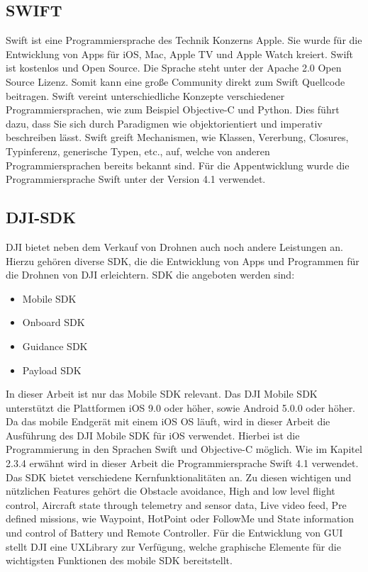 \subsection{SWIFT}\label{subsec:SWIFT}
Swift ist eine Programmiersprache des Technik Konzerns Apple. Sie wurde für die Entwicklung von Apps für iOS, Mac, Apple TV und Apple Watch kreiert. Swift ist kostenlos und Open Source. Die Sprache steht unter der Apache 2.0 Open Source Lizenz. Somit kann eine große Community direkt zum Swift Quellcode beitragen. 
\newline
Swift vereint unterschiedliche Konzepte verschiedener Programmiersprachen, wie zum Beispiel Objective-C und Python. Dies führt dazu, dass Sie sich durch Paradigmen wie objektorientiert und imperativ beschreiben lässt. Swift greift Mechanismen, wie Klassen, Vererbung, Closures, Typinferenz, generische Typen, etc., auf, welche von anderen Programmiersprachen bereits bekannt sind. 
\newline
Für die Appentwicklung wurde die Programmiersprache Swift unter der Version 4.1 verwendet. \cite{Swift} 

\subsection{DJI-\acf{SDK}}\label{subsec:DJI-SDK}
DJI bietet neben dem Verkauf von Drohnen auch noch andere Leistungen an. Hierzu gehören diverse \acs{SDK}, die die Entwicklung von Apps und Programmen für die Drohnen von DJI erleichtern. 
\acs{SDK} die angeboten werden sind:
\begin{itemize}
	\item Mobile SDK
	\item Onboard SDK
	\item Guidance SDK
	\item Payload SDK
\end{itemize}
In dieser Arbeit ist nur das Mobile SDK relevant. 
\newline
Das DJI Mobile SDK unterstützt die Plattformen iOS 9.0 oder höher, sowie Android 5.0.0 oder höher. Da das mobile Endgerät mit einem iOS \acs{OS} läuft, wird in dieser Arbeit die Ausführung des DJI Mobile SDK für iOS verwendet. Hierbei ist die Programmierung in den Sprachen Swift und Objective-C möglich. Wie im Kapitel 2.3.4 erwähnt wird in dieser Arbeit die Programmiersprache Swift 4.1 verwendet. 
\newline
Das SDK bietet verschiedene Kernfunktionalitäten an. Zu diesen wichtigen und nützlichen Features gehört die Obstacle avoidance,  High and low level flight control, Aircraft state through telemetry and sensor data, Live video feed, Pre defined missions, wie Waypoint, HotPoint oder FollowMe und State information und control of Battery und Remote Controller. 
\newline
Für die Entwicklung von \acs{GUI} stellt DJI eine UXLibrary zur Verfügung, welche graphische Elemente für die wichtigsten Funktionen des mobile \acs{SDK} bereitstellt. \cite{DJI.SDK}

